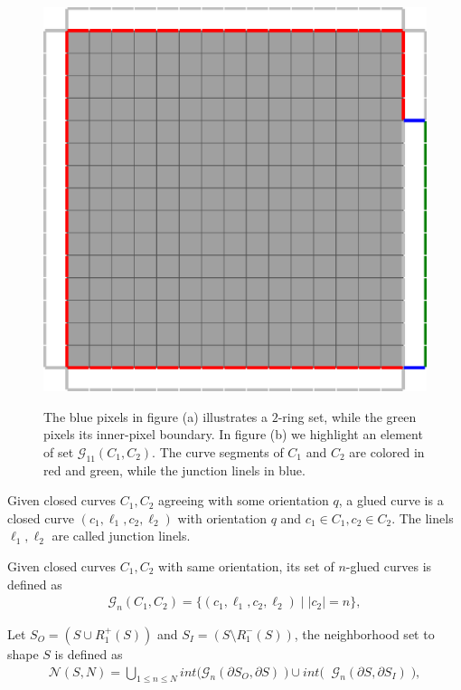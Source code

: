 \documentclass[runningheads]{llncs}
\begin{document}
\begin{figure}
{	\includegraphics[scale=0.2]{images/local_search/definitions/glued-curve.eps}
	}%
	\caption{The blue pixels in figure (a) illustrates a $2$-ring set, while the green pixels its inner-pixel boundary. In figure (b) we highlight an element of set $\mathcal{G}_{11}(C_1,C_2)$. The curve segments of $C_1$ and $C_2$ are colored in red and green, while the junction linels in blue.}
\end{figure}

\begin{definition}
Given closed curves $C_1,C_2$ agreeing with some orientation $q$, a glued curve is a closed curve  $(c_1,\ell_1,c_2,\ell_2)$ with orientation $q$ and $c_1 \in C_1, c_2 \in C_2$. The linels $\ell_1,\ell_2$ are called junction linels.
\end{definition}

\begin{definition}
Given closed curves $C_1,C_2$ with same orientation, its set of $n$-glued curves is defined as
\begin{align*}
	\mathcal{G}_n(C_1,C_2) = \{ (c_1,\ell_1,c_2,\ell_2) \; | \; |c_2|=n \},
\end{align*}
\end{definition}

Let $S_O = ( S \cup R_1^+(S) ) $ and $S_I = ( S \setminus R_1^-(S) ) $, the neighborhood set to shape $S$ is defined as
\begin{align*}
	\mathcal{N}(S,N) = \bigcup_{1 \leq n \leq N} int \big( \mathcal{G}_{n}(\partial S_O, \partial S) \; \big) \cup int \big( \;  \; \mathcal{G}_{n}(\partial S, \partial S_I) \; \big),
\end{align*}
\end{document}
